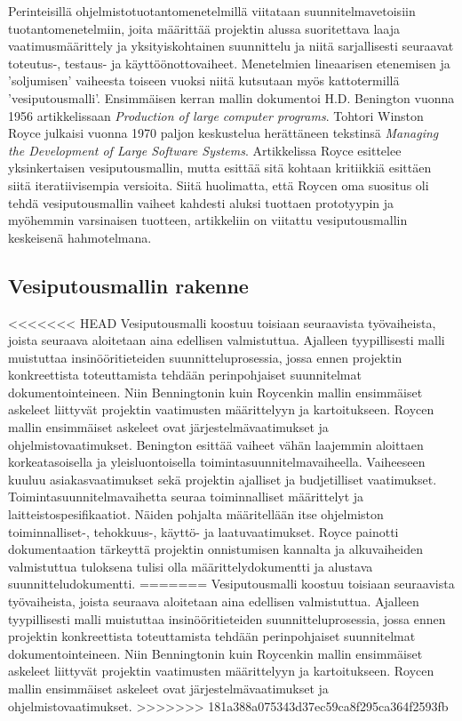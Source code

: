 \documentclass[finnish,12pt]{tktltiki2}
\theoremstyle{definition}
\theoremstyle{remark}
\begin{document}
Perinteisillä ohjelmistotuotantomenetelmillä viitataan suunnitelmavetoisiin tuotantomenetelmiin, joita määrittää projektin alussa suoritettava laaja vaatimusmäärittely ja yksityiskohtainen suunnittelu ja niitä sarjallisesti seuraavat toteutus-, testaus- ja käyttöönottovaiheet. Menetelmien lineaarisen etenemisen ja 'soljumisen' vaiheesta toiseen vuoksi niitä kutsutaan myös kattotermillä 'vesiputousmalli'. Ensimmäisen kerran mallin dokumentoi H.D. Benington vuonna 1956 artikkelissaan \textit{Production of large computer programs}. \cite{Ruparelia:2010:SDL:1764810.1764814, Benington:1987:PLC:41765.41799} Tohtori Winston Royce julkaisi vuonna 1970 paljon keskustelua herättäneen tekstinsä \textit{Managing the Development of Large Software Systems}. Artikkelissa Royce esittelee yksinkertaisen vesiputousmallin, mutta esittää sitä kohtaan kritiikkiä esittäen siitä iteratiivisempia versioita. Siitä huolimatta, että Roycen oma suositus oli tehdä vesiputousmallin vaiheet kahdesti aluksi tuottaen prototyypin ja myöhemmin varsinaisen tuotteen, artikkeliin on viitattu vesiputousmallin keskeisenä hahmotelmana.

\subsection{Vesiputousmallin rakenne}

<<<<<<< HEAD
Vesiputousmalli koostuu toisiaan seuraavista työvaiheista, joista seuraava aloitetaan aina edellisen valmistuttua. Ajalleen tyypillisesti malli muistuttaa insinööritieteiden suunnitteluprosessia, jossa ennen projektin konkreettista toteuttamista tehdään perinpohjaiset suunnitelmat dokumentointeineen. Niin Benningtonin kuin Roycenkin mallin ensimmäiset askeleet liittyvät projektin vaatimusten määrittelyyn ja kartoitukseen. Roycen mallin ensimmäiset askeleet ovat järjestelmävaatimukset ja ohjelmistovaatimukset\cite{Royce1970}. Benington esittää vaiheet vähän laajemmin aloittaen korkeatasoisella ja yleisluontoisella toimintasuunnitelmavaiheella. Vaiheeseen kuuluu asiakasvaatimukset sekä projektin ajalliset ja budjetilliset vaatimukset. Toimintasuunnitelmavaihetta seuraa toiminnalliset määrittelyt ja laitteistospesifikaatiot. \cite{Benington:1987:PLC:41765.41799} Näiden pohjalta määritellään itse ohjelmiston toiminnalliset-, tehokkuus-, käyttö- ja laatuvaatimukset. Royce painotti dokumentaation tärkeyttä projektin onnistumisen kannalta ja alkuvaiheiden valmistuttua tuloksena tulisi olla määrittelydokumentti ja alustava suunnitteludokumentti. 
=======
Vesiputousmalli koostuu toisiaan seuraavista työvaiheista, joista seuraava aloitetaan aina edellisen valmistuttua. Ajalleen tyypillisesti malli muistuttaa insinööritieteiden suunnitteluprosessia, jossa ennen projektin konkreettista toteuttamista tehdään perinpohjaiset suunnitelmat dokumentointeineen. Niin Benningtonin kuin Roycenkin mallin ensimmäiset askeleet liittyvät projektin vaatimusten määrittelyyn ja kartoitukseen. Roycen mallin ensimmäiset askeleet ovat järjestelmävaatimukset ja ohjelmistovaatimukset. 
>>>>>>> 181a388a075343d37ec59ca8f295ca364f2593fb
\end{document}
